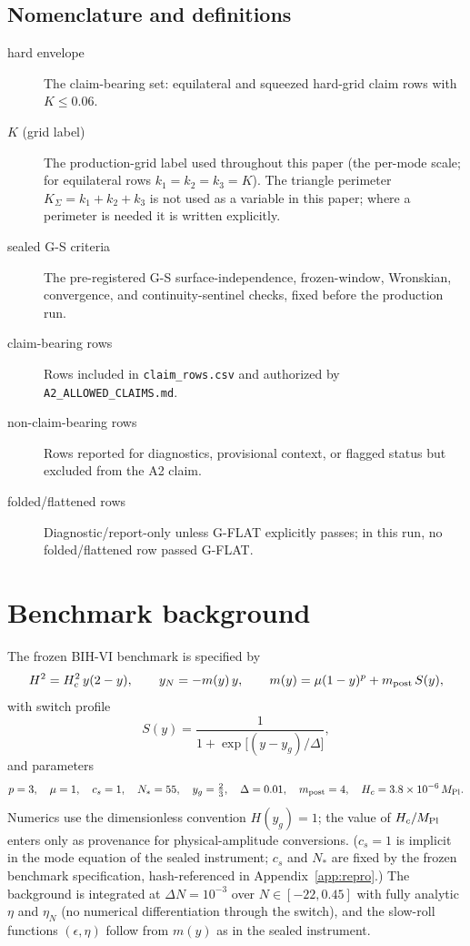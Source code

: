 \documentclass[11pt]{article}
\begin{document}
\subsection*{Nomenclature and definitions}
\begin{description}
\item[hard envelope] The claim-bearing set: equilateral and squeezed hard-grid claim rows with
  $K \leq 0.06$.
\item[$K$ (grid label)] The production-grid label used throughout this paper (the per-mode scale;
  for equilateral rows $k_1 = k_2 = k_3 = K$). The triangle perimeter
  $K_\Sigma = k_1 + k_2 + k_3$ is not used as a variable in this paper; where a perimeter is
  needed it is written explicitly.
\item[sealed G-S criteria] The pre-registered G-S surface-independence, frozen-window, Wronskian,
  convergence, and continuity-sentinel checks, fixed before the production run.
\item[claim-bearing rows] Rows included in \texttt{claim\_rows.csv} and authorized by
  \texttt{A2\_ALLOWED\_CLAIMS.md}.
\item[non-claim-bearing rows] Rows reported for diagnostics, provisional context, or flagged
  status but excluded from the A2 claim.
\item[folded/flattened rows] Diagnostic/report-only unless G-FLAT explicitly passes; in this run,
  no folded/flattened row passed G-FLAT.
\end{description}

\section{Benchmark background}
\label{sec:benchmark}
The frozen BIH-VI benchmark is specified by
\begin{equation}
H^2 = H_c^2\, y(2-y), \qquad
y_N = -m(y)\, y, \qquad
m(y) = \mu (1-y)^p + m_{\rm post}\, S(y),
\end{equation}
with switch profile
\begin{equation}
S(y) = \frac{1}{1 + \exp\!\big[(y - y_g)/\Delta\big]},
\end{equation}
and parameters
\begin{equation}
p = 3,\quad \mu = 1,\quad c_s = 1,\quad N_* = 55,\quad y_g = \tfrac{2}{3},\quad
\Delta = 0.01,\quad m_{\rm post} = 4,\quad H_c = 3.8\times 10^{-6}\, M_{\rm Pl}.
\end{equation}
Numerics use the dimensionless convention $H(y_g) = 1$; the value of $H_c/M_{\rm Pl}$ enters only
as provenance for physical-amplitude conversions. ($c_s = 1$ is implicit in the mode equation of
the sealed instrument; $c_s$ and $N_*$ are fixed by the frozen benchmark specification,
hash-referenced in Appendix~\ref{app:repro}.) The background is integrated at
$\Delta N = 10^{-3}$ over $N \in [-22, 0.45]$ with fully analytic $\eta$ and $\eta_N$ (no numerical
differentiation through the switch), and the slow-roll functions $(\epsilon, \eta)$ follow from
$m(y)$ as in the sealed instrument.
\end{document}
